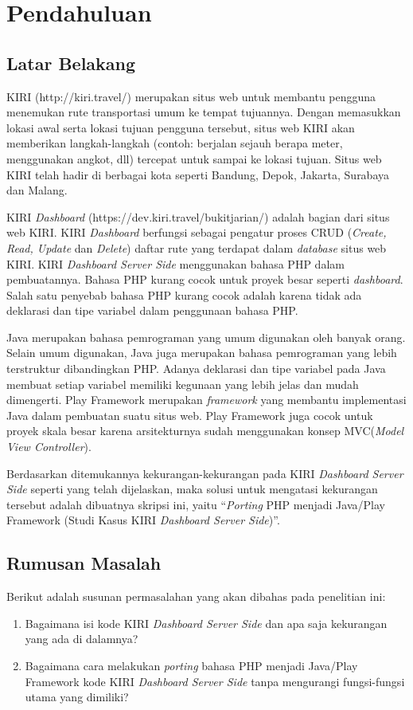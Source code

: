 \chapter{Pendahuluan}
\label{chap:pendahuluan}

\section{Latar Belakang}
\label{sec:latar_belakang}
KIRI (http://kiri.travel/) merupakan situs web untuk membantu pengguna menemukan rute transportasi umum ke tempat tujuannya. Dengan memasukkan lokasi awal serta lokasi tujuan pengguna tersebut, situs web KIRI akan memberikan langkah-langkah (contoh: berjalan sejauh berapa meter, menggunakan angkot, dll) tercepat untuk sampai ke lokasi tujuan. Situs web KIRI telah hadir di berbagai kota seperti Bandung, Depok, Jakarta, Surabaya dan Malang.

KIRI \textit{Dashboard} (https://dev.kiri.travel/bukitjarian/) adalah bagian dari situs web KIRI. KIRI \textit{Dashboard} berfungsi sebagai pengatur proses CRUD (\textit{Create, Read, Update} dan \textit{Delete}) daftar rute yang terdapat dalam \textit{database} situs web KIRI. KIRI \textit{Dashboard Server Side} menggunakan bahasa PHP dalam pembuatannya. Bahasa PHP kurang cocok untuk proyek besar seperti \textit{dashboard}. Salah satu penyebab bahasa PHP kurang cocok adalah karena tidak ada deklarasi dan tipe variabel dalam penggunaan bahasa PHP.

Java merupakan bahasa pemrograman yang umum digunakan oleh banyak orang. Selain umum digunakan, Java juga merupakan bahasa pemrograman yang lebih terstruktur dibandingkan PHP. Adanya deklarasi dan tipe variabel pada Java membuat setiap variabel memiliki kegunaan yang lebih jelas dan mudah dimengerti. Play Framework merupakan \textit{framework} yang membantu implementasi Java dalam pembuatan suatu situs web. Play Framework juga cocok untuk proyek skala besar karena arsitekturnya sudah menggunakan konsep MVC(\textit{Model View Controller}).

Berdasarkan ditemukannya kekurangan-kekurangan pada KIRI \textit{Dashboard Server Side} seperti yang telah dijelaskan, maka solusi untuk mengatasi kekurangan tersebut adalah dibuatnya skripsi ini, yaitu ``\textit{Porting} PHP menjadi Java/Play Framework (Studi Kasus KIRI \textit{Dashboard Server Side})''.

\section{Rumusan Masalah}
\label{sec:rumusan_masalah}
Berikut adalah susunan permasalahan yang akan dibahas pada penelitian ini:
	\begin{enumerate}
		\item Bagaimana isi kode KIRI \textit{Dashboard Server Side} dan apa saja kekurangan yang ada di dalamnya?
		\item Bagaimana cara melakukan \textit{porting} bahasa PHP menjadi Java/Play Framework kode KIRI \textit{Dashboard Server Side} tanpa mengurangi fungsi-fungsi utama yang dimiliki?
	\end{enumerate}
	
